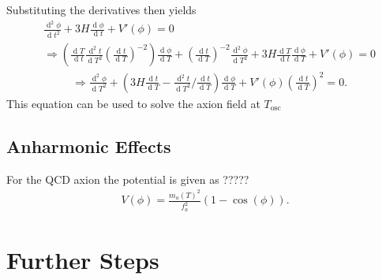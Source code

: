 \documentclass[a4paper]{article}
\DeclareMathOperator*{\diff}{d}
\begin{document}
Substituting the derivatives then yields
\begin{align*}
    & \frac{\diff ^2 \phi}{\diff  t^2} + 3 H \frac{\diff  \phi}{\diff  t} + V'(\phi) = 0 \\
    &\Rightarrow \left(\frac{\diff T}{\diff t} \frac{\diff^2 t}{\diff T^2} \left( \frac{\diff t}{\diff T} \right)^{-2} \right) \frac{\diff \phi}{\diff T} + \left( \frac{\diff t}{\diff T} \right)^{-2} \frac{\diff^2 \phi}{\diff T^2} + 3H\frac{\diff T}{\diff t}\frac{\diff \phi}{\diff T} + V'(\phi) = 0
\end{align*}
\begin{align}
    \label{eq:eom_T}
    &\Rightarrow \frac{\diff^2 \phi}{\diff T^2} + 
                 \left(
                 3H \frac{\diff t}{\diff T}
                 - \frac{\diff^2 t}{\diff T^2} / \frac{\diff t}{\diff T}
                 \right) \frac{\diff \phi}{\diff T} + 
                 V'(\phi) \left( \frac{\diff t}{\diff T} \right)^2 = 0.
\end{align}
This equation can be used to solve the axion field at $T_\mathrm{osc}$
\cite[Section S11]{LatticQCD4Cosmo}

\subsection{Anharmonic Effects}
\label{sec:anharmonic_effects}
For the QCD axion the potential is given as ?????
\begin{align}
    \label{eq:qcd_axion_potential}
    V(\phi) = \frac{m_a(T)^2}{f_a^2} (1 - \cos(\phi)).
\end{align}

\section{Further Steps}

{}

\end{document}
